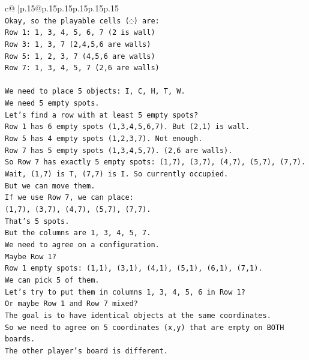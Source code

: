 \documentclass{article}
\begin{document}
{\begin{supertabular}{c@{$\;$}|p{.15\linewidth}@{}p{.15\linewidth}p{.15\linewidth}p{.15\linewidth}p{.15\linewidth}p{.15\linewidth}}
{{{\\ 
\texttt{Okay, so the playable cells (◌) are:} \\
\texttt{Row 1: 1, 3, 4, 5, 6, 7 (2 is wall)} \\
\texttt{Row 3: 1, 3, 7 (2,4,5,6 are walls)} \\
\texttt{Row 5: 1, 2, 3, 7 (4,5,6 are walls)} \\
\texttt{Row 7: 1, 3, 4, 5, 7 (2,6 are walls)} \\
\\ 
\texttt{We need to place 5 objects: I, C, H, T, W.} \\
\texttt{We need 5 empty spots.} \\
\texttt{Let's find a row with at least 5 empty spots?} \\
\texttt{Row 1 has 6 empty spots (1,3,4,5,6,7). But (2,1) is wall.} \\
\texttt{Row 5 has 4 empty spots (1,2,3,7). Not enough.} \\
\texttt{Row 7 has 5 empty spots (1,3,4,5,7). (2,6 are walls).} \\
\texttt{So Row 7 has exactly 5 empty spots: (1,7), (3,7), (4,7), (5,7), (7,7).} \\
\texttt{Wait, (1,7) is T, (7,7) is I. So currently occupied.} \\
\texttt{But we can move them.} \\
\texttt{If we use Row 7, we can place:} \\
\texttt{(1,7), (3,7), (4,7), (5,7), (7,7).} \\
\texttt{That's 5 spots.} \\
\texttt{But the columns are 1, 3, 4, 5, 7.} \\
\texttt{We need to agree on a configuration.} \\
\texttt{Maybe Row 1?} \\
\texttt{Row 1 empty spots: (1,1), (3,1), (4,1), (5,1), (6,1), (7,1).} \\
\texttt{We can pick 5 of them.} \\
\texttt{Let's try to put them in columns 1, 3, 4, 5, 6 in Row 1?} \\
\texttt{Or maybe Row 1 and Row 7 mixed?} \\
\texttt{The goal is to have identical objects at the same coordinates.} \\
\texttt{So we need to agree on 5 coordinates (x,y) that are empty on BOTH boards.} \\
\texttt{The other player's board is different.} \\
}}}
\end{supertabular}}
\end{document}
